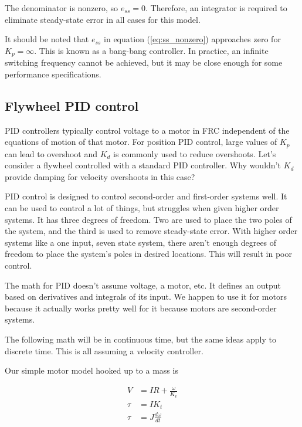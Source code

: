 The denominator is nonzero, so $e_{ss} = 0$. Therefore, an integrator is
required to eliminate \gls{steady-state error} in all cases for this
\gls{model}.

It should be noted that $e_{ss}$ in equation (\ref{eq:ss_nonzero}) approaches
zero for $K_p = \infty$. This is known as a bang-bang controller. In practice,
an infinite switching frequency cannot be achieved, but it may be close enough
for some performance specifications.

\subsection{Flywheel PID control}
\label{subsec:flywheel_pid_control}

PID controllers typically control voltage to a motor in FRC independent of the
equations of motion of that motor. For position PID control, large values of
$K_p$ can lead to overshoot and $K_d$ is commonly used to reduce overshoots.
Let's consider a flywheel controlled with a standard PID controller. Why
wouldn't $K_d$ provide damping for velocity overshoots in this case?

PID control is designed to control second-order and first-order \glspl{system}
well. It can be used to control a lot of things, but struggles when given higher
order \glspl{system}. It has three degrees of freedom. Two are used to place the
two poles of the \gls{system}, and the third is used to remove steady-state
error. With higher order \glspl{system} like a one input, seven \gls{state}
\gls{system}, there aren't enough degrees of freedom to place the \gls{system}'s
poles in desired locations. This will result in poor control.

The math for PID doesn't assume voltage, a motor, etc. It defines an output
based on derivatives and integrals of its input. We happen to use it for motors
because it actually works pretty well for it because motors are second-order
\glspl{system}.

The following math will be in continuous time, but the same ideas apply to
discrete time. This is all assuming a velocity controller.

Our simple motor model hooked up to a mass is

\begin{align}
  V &= IR + \frac{\omega}{K_v} \label{eq:cs_flywheel_1} \\
  \tau &= I K_t \label{eq:cs_flywheel_2} \\
  \tau &= J \frac{d\omega}{dt} \label{eq:cs_flywheel_3}
\end{align}


